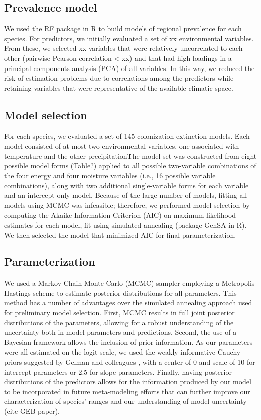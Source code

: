 \documentclass[11pt]{article}
\begin{document}
\subsection*{Prevalence model}
We used the RF package in R to build models of regional prevalence for each species. 
For predictors, we initially evaluated a set of xx environmental variables. 
From these, we selected xx variables that were relatively uncorrelated to each other (pairwise Pearson correlation < xx) and that had high loadings in a principal components analysis (PCA) of all variables. 
In this way, we reduced the risk of estimation problems due to correlations among the predictors while retaining variables that were representative of the available climatic space.

\subsection*{Model selection}
For each species, we evaluated a set of 145 colonization-extinction models. 
Each model consisted of at most two environmental variables, one associated with temperature and the other precipitation\. 
The model set was constructed from eight possible model forms (Table?) applied to all possible two-variable combinations of the four energy and four moisture variables (i.e., 16 possible variable combinations), along with two additional single-variable forms for each variable and an intercept-only model. 
Because of the large number of models, fitting all models using MCMC was infeasible; therefore, we performed model selection by computing the Akaike Information Criterion (AIC) on maximum likelihood estimates for each model, fit using simulated annealing (package GenSA in R). 
We then selected the model that minimized AIC for final parameterization.

\subsection*{Parameterization}
We used a Markov Chain Monte Carlo (MCMC) sampler employing a Metropolis-Hastings scheme to estimate posterior distributions for all parameters.
This method has a number of advantages over the simulated annealing approach used for preliminary model selection.
First, MCMC results in full joint posterior distributions of the parameters, allowing for a robust understanding of the uncertainty both in model parameters and predictions.
Second, the use of a Bayesian framework allows the inclusion of prior information.
As our parameters were all estimated on the logit scale, we used the weakly informative Cauchy priors suggested by Gelman and colleagues \cite{Gelman2008}, with a center of 0 and scale of 10 for intercept parameters or 2.5 for slope parameters.
Finally, having posterior distributions of the predictors allows for the information produced by our model to be incorporated in future meta-modeling efforts that can further improve our characterization of species' ranges and our understanding of model uncertainty (cite GEB paper).
\end{document}
